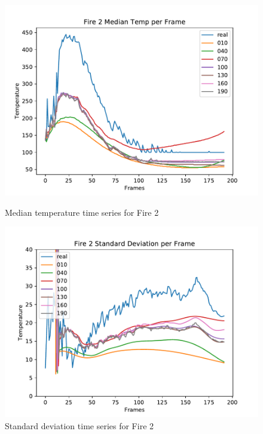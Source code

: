 \documentclass{article}
\begin{document}
\begin{figure}[ht]
  \begin{minipage}[b]{0.5\linewidth}
    \centering
    \includegraphics[width=1.1\linewidth]{../plots/f2_mediantemp.pdf} 
    \caption{Median temperature time series for Fire 2} 
    \vspace{4ex}
  \end{minipage}%
  \begin{minipage}[b]{0.5\linewidth}
    \centering
    \includegraphics[width=1.1\linewidth]{../plots/f2_stdtemp.pdf} 
    \caption{Standard deviation time series for Fire 2} 
    \vspace{4ex}
  \end{minipage} 

\end{figure}
\end{document}
